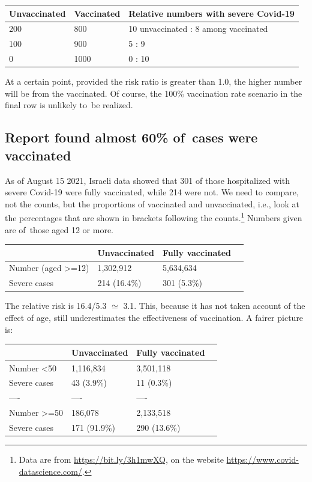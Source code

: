 \documentclass[
  10pt,
  b5paper]{book}
\begin{document}
\begin{longtable}[]{@{}lll@{}}
\toprule
Unvaccinated & Vaccinated & Relative numbers with severe Covid-19 \\
\midrule
\endhead
200 & 800 & 10 unvaccinated : 8 among vaccinated \\
100 & 900 & 5 : 9 \\
0 & 1000 & 0 : 10 \\
\bottomrule
\end{longtable}

At a certain point, provided the risk ratio is greater than 1.0,
the higher number will be from the vaccinated. Of course,
the 100\% vaccination rate scenario in the final row is unlikely
to~be realized.

\hypertarget{report-found-almost-60-of-cases-were-vaccinated}{%
\subsection*{Report found almost 60\% of~cases were vaccinated}\label{report-found-almost-60-of-cases-were-vaccinated}}

As of August 15 2021, Israeli data showed that 301 of those hospitalized with severe Covid-19 were fully vaccinated, while 214 were not.
We need to compare, not the counts, but the proportions of
vaccinated and unvaccinated, i.e., look at the percentages that are
shown in brackets following the counts.\footnote{Data are from
  \url{https://bit.ly/3h1mwXQ}, on the website \url{https://www.covid-datascience.com/}.}
Numbers given are of~those aged 12 or more.

\begin{longtable}[]{@{}llll@{}}
\toprule
& Unvaccinated & Fully vaccinated & \\
\midrule
\endhead
Number (aged \textgreater=12) & 1,302,912 & 5,634,634 & \\
Severe cases & 214 (16.4\%) & 301 (5.3\%) & \\
\bottomrule
\end{longtable}

The relative risk is 16.4/5.3 \(\simeq\) 3.1.
This, because it has not taken account of the effect of age,
still underestimates the effectiveness of vaccination. A fairer
picture is:

\begin{longtable}[]{@{}llll@{}}
\toprule
& Unvaccinated & Fully vaccinated & \\
\midrule
\endhead
Number \textless50 & 1,116,834 & 3,501,118 & \\
Severe cases & 43 (3.9\%) & 11 (0.3\%) & \\
---- & ---- & ---- & \\
Number \textgreater=50 & 186,078 & 2,133,518 & \\
Severe cases & 171 (91.9\%) & 290 (13.6\%) & \\
\bottomrule
\end{longtable}
\end{document}
